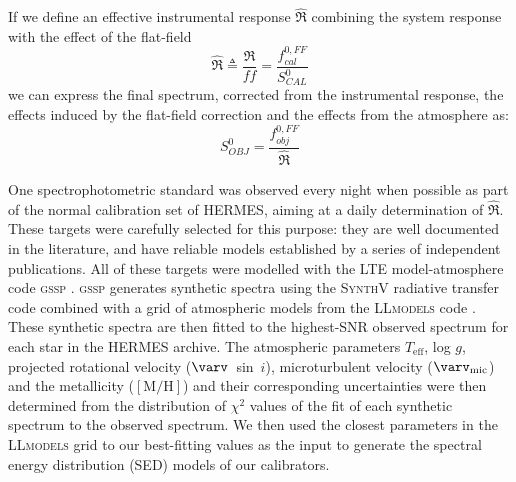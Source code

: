 If we define an effective instrumental response $\hat{\Re}$ combining the system response with the effect of the flat-field
\begin{equation}
    \label{eqn:hatre}
    \hat{\Re} \triangleq \frac{\Re}{ff} = \frac{f^{0,FF}_{cal}}{S^0_{CAL}}
\end{equation}
we can express the final spectrum, corrected from the instrumental response, the effects induced by the flat-field correction and the effects from the atmosphere as:
\begin{equation}
\label{eqn:Sfinal}
S^0_{OBJ} = \frac{f^{0,FF}_{obj}}{\hat{\Re}}
\end{equation}


One spectrophotometric standard was observed every night when possible as part of the normal calibration set of HERMES, aiming at a daily determination of $\hat{\Re}$. These targets were carefully selected for this purpose: they are well documented in the literature, and have reliable models established by a series of independent publications. All of these targets were modelled with the LTE model-atmosphere code \textsc{gssp} \citep{tkachenko_grid_2015}. \textsc{gssp} generates synthetic spectra using the \textsc{SynthV} radiative transfer code \citep{tsymbal_starsp_1996} combined with a grid of atmospheric models from the \textsc{LLmodels} code \citep{shulyak_line-by-line_2004}. These synthetic spectra are then fitted to the highest-SNR observed spectrum for each star in the HERMES archive. The atmospheric parameters $T_{\text{eff}}$, log $g$, projected rotational velocity ($\varv$~sin~$i$), microturbulent velocity ($\varv_{\text{mic}}$) and the metallicity ($\mathrm{[M/H]}$) and their corresponding uncertainties were then determined from the distribution of $\chi^{2}$ values of the fit of each synthetic spectrum to the observed spectrum. We then used the closest parameters in the \textsc{LLmodels} grid to our best-fitting values as the input to generate the spectral energy distribution (SED) models of our calibrators.

